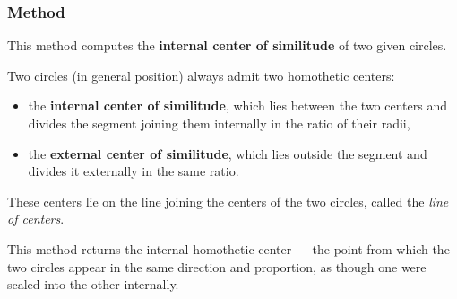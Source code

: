 \begin{minipage}{.5\textwidth}
\begin{center}
\end{center}
\end{minipage}
\begin{minipage}{.5\textwidth}
\begin{tkzexample}
\end{tkzexample}
\end{minipage}


\subsubsection{Method } %
\label{ssub:method_circle_internal__similitude}

This method computes the \textbf{internal center of similitude} of two given circles.

\medskip
\noindent
Two circles (in general position) always admit two homothetic centers:
\begin{itemize}
  \item the \textbf{internal center of similitude}, which lies between the two centers and divides the segment joining them internally in the ratio of their radii,
  \item the \textbf{external center of similitude}, which lies outside the segment and divides it externally in the same ratio.
\end{itemize}

\noindent
These centers lie on the line joining the centers of the two circles, called the \emph{line of centers}.

\medskip
\noindent
This method returns the internal homothetic center — the point from which the two circles appear in the same direction and proportion, as though one were scaled into the other internally.

